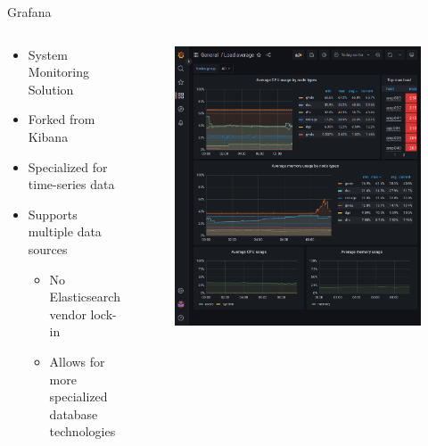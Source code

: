 \documentclass[compress,aspectratio=169]{beamer}
\begin{document}
\begin{frame}{Grafana}
\begin{columns}[T]
\begin{column}{0.5\textwidth}
\begin{itemize}
  \item System Monitoring Solution
  \item Forked from Kibana
  \item Specialized for time-series data
  \item Supports multiple data sources
  \begin{itemize}
    \item No Elasticsearch vendor lock-in
    \item Allows for more specialized database technologies
  \end{itemize}
\end{itemize}
\end{column}
\begin{column}{0.5\textwidth}
\begin{figure}
  \includegraphics[height=.8\textheight]{example_grafana_dashboard.png}
\end{figure}
\end{column}
\end{columns}
\end{frame}
\end{document}
